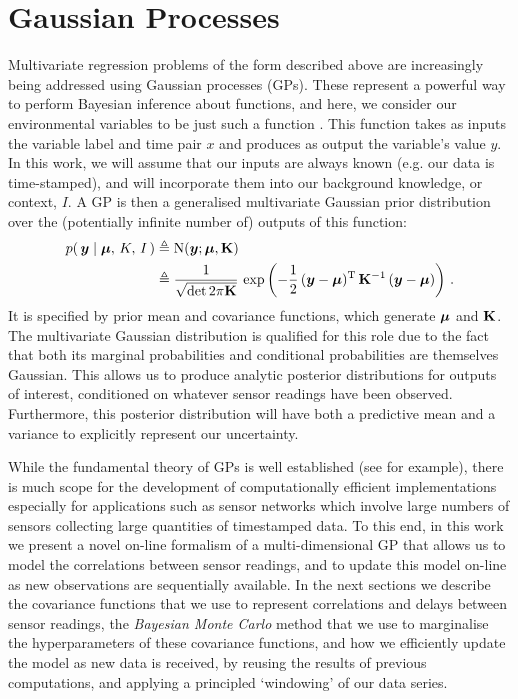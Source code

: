 \documentclass{acmsmall}
\begin{document}
\section{Gaussian Processes}\label{sec_gp}

\noindent Multivariate regression problems of the form described above are increasingly being addressed using Gaussian processes (GPs). These represent a powerful way to perform Bayesian inference about functions, and here, we consider our environmental variables to be just such a function \cite{GPsBook}. This function takes as inputs the variable label and time pair $x$ and produces as output the variable's value $y$. In this work, we will assume that our inputs are always known (e.g. our data is time-stamped), and will incorporate them into our background knowledge, or context, $I$. A GP is then a generalised multivariate Gaussian prior distribution over the (potentially infinite number of) outputs of this function:
\begin{align*}%
\p{\vy}{\vmu,\,K,\,I} & \defequal \N{\vy}{\vmu}{\mat{K}}\nonumber\\
& \defequal\frac{1}{\sqrt{\det{2\pi\mat{K}}}}\,\exp \left(-\frac{1}{2}\,(\vy-\vmu)^\tr\,\mat{K}^{-1}\,(\vy-\vmu)\right)\,.
\end{align*}
It is specified by prior mean and covariance functions, which generate $\boldsymbol{\mu}$ and $\mathbf{K}$.
 The multivariate Gaussian distribution is qualified for this role due to the fact that both its marginal probabilities and conditional probabilities are themselves Gaussian. This allows us to produce analytic posterior distributions for outputs of interest, conditioned on whatever sensor readings have been observed. Furthermore, this posterior distribution will have both a predictive mean and a variance to explicitly represent our uncertainty.

While the fundamental theory of GPs is well established (see  for example), there is much scope for the development of computationally efficient implementations especially for applications such as sensor networks which involve large numbers of sensors collecting large quantities of timestamped data. To this end, in this work we present a novel on-line formalism of a multi-dimensional GP that allows us to model the correlations between sensor readings, and to update this model on-line as new observations are sequentially available. In the next sections we describe the covariance functions that we use to represent correlations and delays between sensor readings, the {\em Bayesian Monte Carlo} method that we use to marginalise the hyperparameters of these covariance functions, and how we efficiently update the model as new data is received, by reusing the results of previous computations, and applying a principled `windowing' of our data series.
\end{document}
